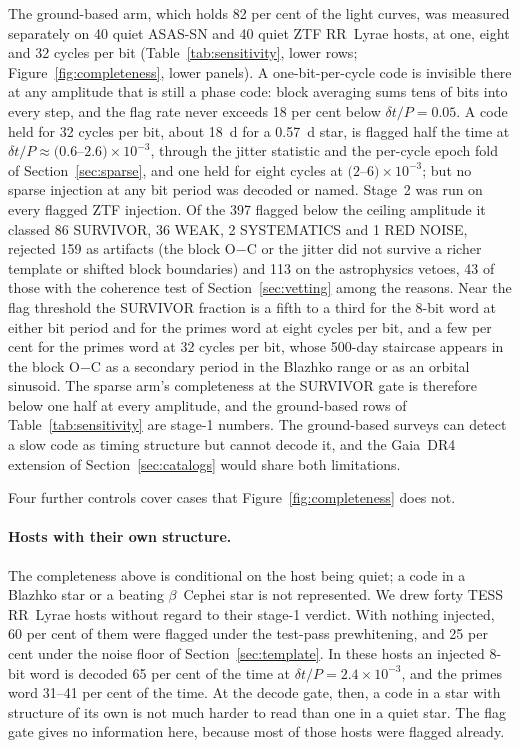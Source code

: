 \documentclass[final,5p]{elsarticle}
\newcommand{\oc}{O$-$C}
\newcommand{\dtp}{\ensuremath{\delta t/P}}
\newcommand{\bcep}{\ensuremath{\beta}~Cephei}
\begin{document}
The ground-based arm, which holds 82 per cent of the light curves, was measured separately on 40 quiet ASAS-SN and 40 quiet ZTF RR~Lyrae hosts, at one, eight and 32 cycles per bit (Table~\ref{tab:sensitivity}, lower rows; Figure~\ref{fig:completeness}, lower panels). A one-bit-per-cycle code is invisible there at any amplitude that is still a phase code: block averaging sums tens of bits into every step, and the flag rate never exceeds 18 per cent below $\dtp=0.05$. A code held for 32 cycles per bit, about 18~d for a 0.57~d star, is flagged half the time at $\dtp\approx(0.6$--$2.6)\times10^{-3}$, through the jitter statistic and the per-cycle epoch fold of Section~\ref{sec:sparse}, and one held for eight cycles at $(2$--$6)\times10^{-3}$; but no sparse injection at any bit period was decoded or named. Stage~2 was run on every flagged ZTF injection. Of the 397 flagged below the ceiling amplitude it classed 86 SURVIVOR, 36 WEAK, 2 SYSTEMATICS and 1 RED NOISE, rejected 159 as artifacts (the block \oc{} or the jitter did not survive a richer template or shifted block boundaries) and 113 on the astrophysics vetoes, 43 of those with the coherence test of Section~\ref{sec:vetting} among the reasons. Near the flag threshold the SURVIVOR fraction is a fifth to a third for the 8-bit word at either bit period and for the primes word at eight cycles per bit, and a few per cent for the primes word at 32 cycles per bit, whose 500-day staircase appears in the block \oc{} as a secondary period in the Blazhko range or as an orbital sinusoid. The sparse arm's completeness at the SURVIVOR gate is therefore below one half at every amplitude, and the ground-based rows of Table~\ref{tab:sensitivity} are stage-1 numbers. The ground-based surveys can detect a slow code as timing structure but cannot decode it, and the Gaia~DR4 extension of Section~\ref{sec:catalogs} would share both limitations.

Four further controls cover cases that Figure~\ref{fig:completeness} does not.

\paragraph{Hosts with their own structure.}
The completeness above is conditional on the host being quiet; a code in a Blazhko star or a beating \bcep{} star is not represented. We drew forty TESS RR~Lyrae hosts without regard to their stage-1 verdict. With nothing injected, 60 per cent of them were flagged under the test-pass prewhitening, and 25 per cent under the noise floor of Section~\ref{sec:template}. In these hosts an injected 8-bit word is decoded 65 per cent of the time at $\dtp=2.4\times10^{-3}$, and the primes word 31--41 per cent of the time. At the decode gate, then, a code in a star with structure of its own is not much harder to read than one in a quiet star. The flag gate gives no information here, because most of those hosts were flagged already.
\end{document}
